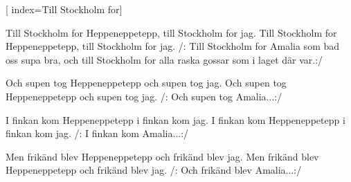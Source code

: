 [ 						
	index={Till Stockholm for}]		
	
\beginverse*						
Till Stockholm for Heppeneppetepp, 
till Stockholm for jag.
Till Stockholm for Heppeneppetepp,
till Stockholm for jag.
\endverse	
\beginchorus
/: Till Stockholm for Amalia
som bad oss supa bra, 
och till Stockholm for alla raska gossar
som i laget där var.:/
\endchorus		

\beginverse				
Och supen tog Heppeneppetepp
och supen tog jag.
Och supen tog Heppeneppetepp
och supen tog jag.
\endverse	
\beginchorus
/: Och supen tog Amalia...:/
\endchorus	

\beginverse
I finkan kom Heppeneppetepp
i finkan kom jag. 
I finkan kom Heppeneppetepp
i finkan kom jag.
\endverse	
\beginchorus
/: I finkan kom Amalia...:/
\endchorus

\beginverse
Men frikänd blev Heppeneppetepp
och frikänd blev jag. 
Men frikänd blev Heppeneppetepp
och frikänd blev jag. 
\endverse	
\beginchorus
/: Och frikänd blev Amalia...:/
\endchorus	
\endsong		
